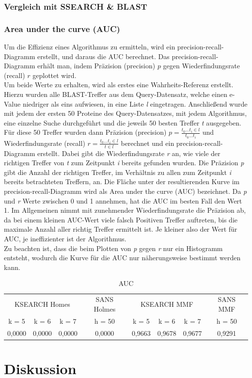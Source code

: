\documentclass{article}
\begin{document}
\subsubsection{Vergleich mit SSEARCH \& BLAST}

\subsubsection{Area under the curve (AUC)}

Um die Effizienz eines Algorithmus zu ermitteln, wird ein precision-recall-Diagramm erstellt, und daraus die AUC berechnet. Das precision-recall-Diagramm erhält man, indem Präzision (precision) $p$ gegen Wiederfindungsrate (recall) $r$ geplottet wird.\\ Um beide Werte zu erhalten, wird als erstes eine Wahrheits-Referenz erstellt. Hierzu wurden alle BLAST-Treffer aus dem Query-Datensatz, welche einen e-Value niedriger als eins aufwiesen, in eine Liste \textit l eingetragen. Anschließend wurde mit jedem der ersten 50 Proteine des Query-Datensatzes, mit jedem Algorithmus, eine einzelne Suche durchgeführt und die jeweils 50 besten Treffer \textit t ausgegeben. Für diese 50 Treffer wurden dann Präzision (precision) $p = \frac{t_0 ... t_i \in l}{t_0 ... t_i}$ und Wiederfindungsrate (recall) $r = \frac {t_0 ... t_i \in l}{t \in l}$ berechnet und ein precision-recall-Diagramm erstellt. Dabei gibt die Wiederfindungsrate \textit r an, wie viele der richtigen Treffer von \textit t zum Zeitpunkt \textit i bereits gefunden wurden. Die Präzision \textit p gibt die Anzahl der richtigen Treffer, im Verhältnis zu allen zum Zeitpunkt \textit i bereits betrachteten Treffern, an. Die Fläche unter der resultierenden Kurve im precision-recall-Diagramm wird als Area under the curve (AUC) bezeichnet. Da \textit p und \textit r Werte zwischen 0 und 1 annehmen, hat die AUC im besten Fall den Wert 1. Im Allgemeinen nimmt mit zunehmender Wiederfindungsrate die Präzision ab, da bei einem kleinen AUC-Wert viele falsch Positiven Treffer auftreten, bis die maximale Anzahl aller richtig Treffer ermittelt ist. Je kleiner also der Wert für AUC, je ineffizienter ist der Algorithmus.\\Zu beachten ist, dass die beim Plotten von \textit p gegen \textit r nur ein Histogramm entsteht, wodurch die Kurve für die AUC nur näherungsweise bestimmt werden kann.
  \begin{table}[h]
    \caption{AUC}
    \begin{center}
    \begin{tabular}{cccccccc}
      \hline
       \multicolumn{3}{c}{KSEARCH Homes} & SANS Holmes&\multicolumn{3}{c}{KSEARCH MMF} & SANS MMF\\
      \cline{1-3}\cline{5-7}
      k = 5 & k = 6 & k = 7 & h = 50 & k = 5 & k = 6 & k = 7 & h = 50 \\
      \hline
      0,0000 & 0,0000 & 0,0000 & 0,0000 & 0,9663 & 0,9678 & 0,9677 & 0,9291 \\
      \hline
    \end{tabular}
    \end{center}
  \end{table}

\section{Diskussion}

{}

\end{document}
